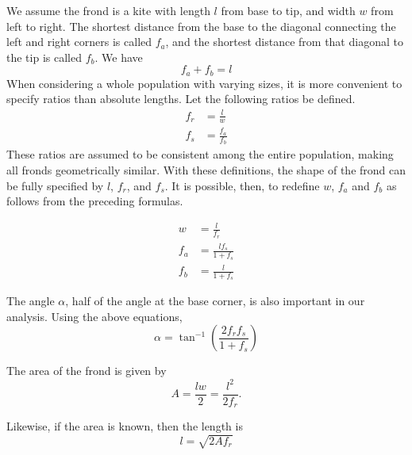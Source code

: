 We assume the frond is a kite with length $l$ from base to tip, and width $w$ from left to right.
 The shortest distance from the base to the diagonal connecting the left and right corners is called $f_a$, and the shortest distance from that diagonal to the tip is called $f_b$.
 We have
 \begin{equation}
	 f_a + f_b = l
 \end{equation}
When considering a whole population with varying sizes, it is more convenient to specify ratios than absolute lengths.
Let the following ratios be defined.
\begin{align}
	f_r &= \frac{l}{w} \\
	f_s &= \frac{f_a}{f_b}
\end{align}
These ratios are assumed to be consistent among the entire population, making all fronds geometrically similar.
With these definitions, the shape of the frond can be fully specified by $l$, $f_r$, and $f_s$.
It is possible, then, to redefine $w$, $f_a$ and $f_b$ as follows from the preceding formulas.

\begin{align}
	w &= \frac{l}{f_r} \\
	f_a &= \frac{lf_s}{1+f_s} \\
	f_b &= \frac{l}{1+f_s}
\end{align}

The angle $\alpha$, half of the angle at the base corner, is also important in our analysis.
Using the above equations,
\begin{equation}
	\alpha = \tan^{-1}\left(\frac{2f_rf_s}{1+f_s}\right)
\end{equation}

The area of the frond is given by
\begin{equation}
  A = \frac{lw}{2} = \frac{l^2}{2f_r}.
\end{equation}

Likewise, if the area is known, then the length is
\begin{equation}
  l = \sqrt{2Af_r}
  \label{eqn:length-from-area}
\end{equation}

